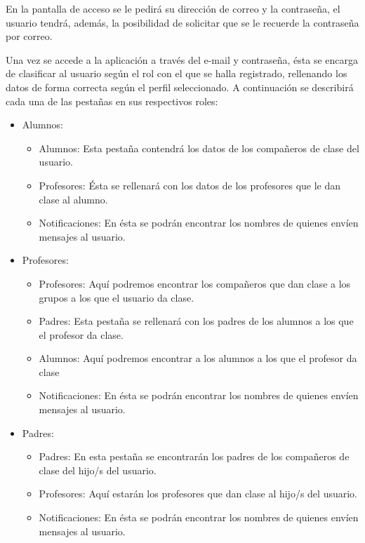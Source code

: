 		En la pantalla de acceso se le pedirá su dirección de correo y la contraseña, el usuario tendrá, además, la posibilidad de solicitar que se le recuerde la contraseña por correo.
		
		\bigskip
		Una vez se accede a la aplicación a través del e-mail y contraseña, ésta se encarga de clasificar al usuario según el rol con el que se halla registrado, rellenando los datos de forma correcta según el perfil seleccionado. A continuación se describirá cada una de las pestañas en sus respectivos roles:
		\bigskip
		\begin{itemize}
			\item Alumnos:
				\begin{itemize}
					\item Alumnos: Esta pestaña contendrá los datos de los compañeros de clase del usuario.
					\item Profesores: Ésta se rellenará con los datos de los profesores que le dan clase al alumno.
					\item Notificaciones: En ésta se podrán encontrar los nombres de quienes envíen mensajes al usuario.
				\end{itemize}
			\item Profesores:
				\begin{itemize}
					\item Profesores: Aquí podremos encontrar los compañeros que dan clase a los grupos a los que el usuario da clase.
					\item Padres: Esta pestaña se rellenará con los padres de los alumnos a los que el profesor da clase.
					\item Alumnos: Aquí podremos encontrar a los alumnos a los que el profesor da clase
					\item Notificaciones: En ésta se podrán encontrar los nombres de quienes envíen mensajes al usuario.
				\end{itemize}
			\item Padres:
				\begin{itemize}
					\item Padres: En esta pestaña se encontrarán los padres de los compañeros de clase del hijo/s del usuario.
					\item Profesores: Aquí estarán los profesores que dan clase al hijo/s del usuario.
					\item Notificaciones: En ésta se podrán encontrar los nombres de quienes envíen mensajes al usuario.
				\end{itemize}
		\end{itemize}
										
